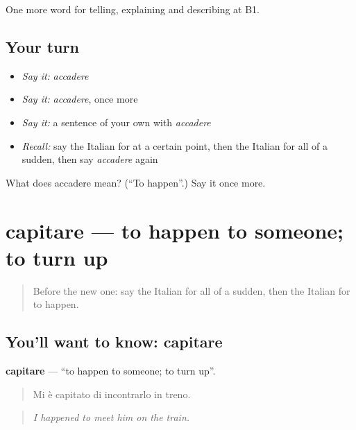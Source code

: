 \begin{grammarlens}[title={What you've built}]
One more word for telling, explaining and describing at B1.
\end{grammarlens}

\subsection*{Your turn}
\begin{itemize}
\raggedright
  \item \emph{Say it:} \emph{accadere}
  \item \emph{Say it:} \emph{accadere}, once more
  \item \emph{Say it:} a sentence of your own with \emph{accadere}
  \item \emph{Recall:} say the Italian for at a certain point, then the Italian for all of a sudden, then say \emph{accadere} again
\end{itemize}

\begin{tcolorbox}[breakable,colback=teal!4,colframe=teal!35!black,title={Before you move on}]
What does accadere mean? (\textquotedblleft{}To happen\textquotedblright{}.) Say it once more.
\end{tcolorbox}
\section[capitare]{capitare — to happen to someone; to turn up}

\label{lesson:IT-C275-capitare}



\begin{quote}
Before the new one: say the Italian for all of a sudden, then the Italian for to happen.
\end{quote}

\subsection*{You'll want to know: capitare}
\textbf{capitare} — \textquotedblleft{}to happen to someone; to turn up\textquotedblright{}.

\begin{quote}
Mi è capitato di incontrarlo in treno.
\end{quote}

\begin{quote}
\emph{I happened to meet him on the train.}
\end{quote}

